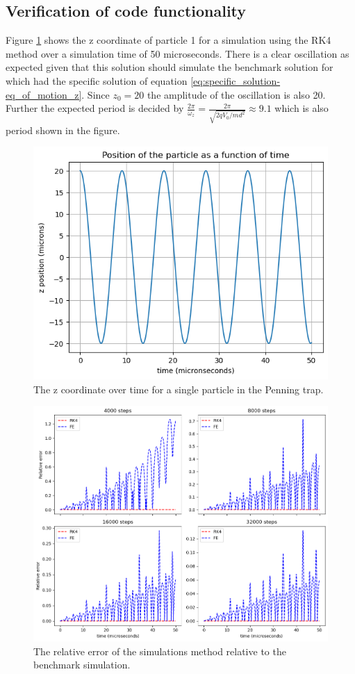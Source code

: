 \documentclass[../main_proj3.tex]{subfiles}
\begin{document}
\subsection{Verification of code functionality}

Figure \ref{fig:single_z} shows the z coordinate of particle 1 for a simulation using the RK4 method over a simulation time of 50 microseconds. There is a clear oscillation as expected given that this solution should simulate the benchmark solution for which had the specific solution of equation \eqref{eq:specific_solution-eq_of_motion_z}. Since $z_0=20$ the amplitude of the oscillation is also 20. Further the expected period is decided by $\frac{2\pi}{\omega_z} = \frac{2\pi}{\sqrt{2qV_0/md^{2}}} \approx  9.1$ which is also period shown in the figure.

\begin{figure}[h!]
    \centering
    \includegraphics[width=0.9\linewidth]{Project 3/figures/single_particle_z_position.png}
    \caption{The z coordinate over time for a single particle in the Penning trap.}
    \label{fig:single_z}
\end{figure}
\begin{figure}[ht]
    \centering
    \includegraphics[width=.9\textwidth]{Project 3/figures/single_particle_relative_error.png} %
    \caption{The relative error of the simulations method relative to the benchmark simulation.}
    \label{fig:rel_error}
\end{figure}
\end{document}
